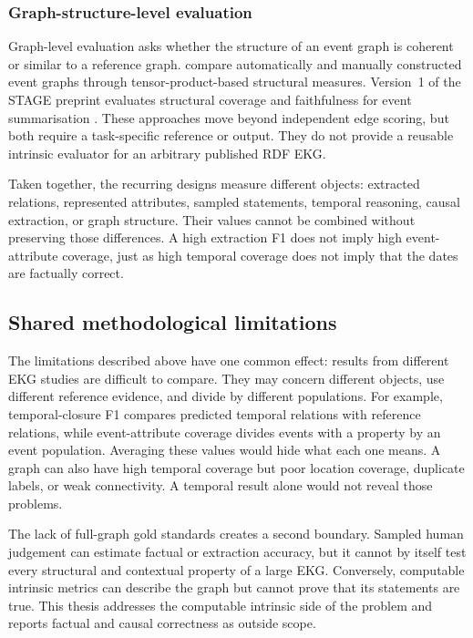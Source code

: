 \subsubsection{Graph-structure-level evaluation}

Graph-level evaluation asks whether the structure of an event graph is coherent or similar to a reference graph. \citet{glavas2014} compare automatically and manually constructed event graphs through tensor-product-based structural measures. Version~1 of the STAGE preprint evaluates structural coverage and faithfulness for event summarisation \citep{stage2026}. These approaches move beyond independent edge scoring, but both require a task-specific reference or output. They do not provide a reusable intrinsic evaluator for an arbitrary published RDF EKG.

Taken together, the recurring designs measure different objects: extracted relations, represented attributes, sampled statements, temporal reasoning, causal extraction, or graph structure. Their values cannot be combined without preserving those differences. A high extraction F1 does not imply high event-attribute coverage, just as high temporal coverage does not imply that the dates are factually correct.

\subsection{Shared methodological limitations}

The limitations described above have one common effect: results from different EKG studies are difficult to compare. They may concern different objects, use different reference evidence, and divide by different populations. For example, temporal-closure F1 compares predicted temporal relations with reference relations, while event-attribute coverage divides events with a property by an event population. Averaging these values would hide what each one means. A graph can also have high temporal coverage but poor location coverage, duplicate labels, or weak connectivity. A temporal result alone would not reveal those problems.

The lack of full-graph gold standards creates a second boundary. Sampled human judgement can estimate factual or extraction accuracy, but it cannot by itself test every structural and contextual property of a large EKG. Conversely, computable intrinsic metrics can describe the graph but cannot prove that its statements are true. This thesis addresses the computable intrinsic side of the problem and reports factual and causal correctness as outside scope.

